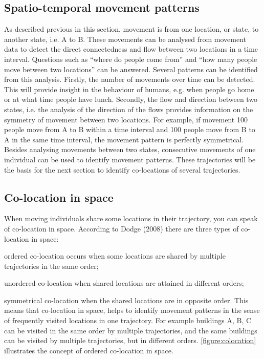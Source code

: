 \subsection{Spatio-temporal movement patterns}
As described previous in this section, movement is from one location, or state, to another state, i.e. A to B. These movements can be analysed from movement data to detect the direct connectedness and flow between two locations in a time interval. Questions such as “where do people come from” and “how many people move between two locations” can be answered. Several patterns can be identified from this analysis. Firstly, the number of movements over time can be detected. This will provide insight in the behaviour of humans, e.g. when people go home or at what time people have lunch. Secondly, the flow and direction between two states, i.e. the analysis of the direction of the flows provides information on the symmetry of movement between two locations. For example, if movement 100 people move from A to B within a time interval and 100 people move from B to A in the same time interval, the movement pattern is perfectly symmetrical.
Besides analysing movements between two states, consecutive movements of one individual can be used to identify movement patterns. These trajectories will be the basis for the next section to identify co-locations of several trajectories. 	

\subsection{Co-location in space}
When moving individuals share some locations in their trajectory, you can speak of co-location in space. According to Dodge (2008) there are three types of co-location in space: \begin {enumerate*} [label=\itshape\arabic*\upshape),font={\color{red!0!black}\bfseries}] \item ordered co-location occurs when some locations are shared by multiple trajectories in the same order; \item unordered co-location when shared locations are attained in different orders; \item symmetrical co-location when the shared locations are in opposite order. This means that co-location in space, helps to identify movement patterns in the sense of frequently visited  locations in one trajectory. For example buildings A, B, C can be visited in the same order by multiple trajectories, and the same buildings can be visited by multiple trajectories, but in different orders. \autoref{figure:colocation} illustrates the concept of ordered co-location in space.
\end{enumerate*}

